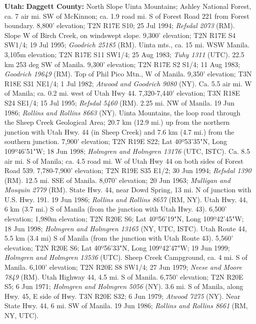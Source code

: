   \textbf{Utah:}
  \textbf{Daggett County:}
North Slope Uinta Mountains; Ashley National Forest, ca. 7 air mi. SW of
McKinnon; ca. 1.9 road mi. S of Forest Road 221 from Forest boundary.
8,800' elevation; T2N R17E S10; 25 Jul 1994; \textit{Refsdal 2073} (RM).
Slope W of Birch Creek, on windswept slope. 9,300' elevation; T2N R17E S4 SW1/4;
19 Jul 1995; \textit{Goodrich 25185} (RM).
Uinta mts., ca. 15 mi. WSW Manila. 3,105m elevation; T2N R17E S11 SW1/4;
25 Aug 1983; \textit{Tuhy 1311} (UTC).
22.5 km 253 deg SW of Manila. 9,300' elevation; T2N R17E S2 S1/4; 11 Aug 1983;
\textit{Goodrich 19649} (RM).
Top of Phil Pico Mtn., W of Manila. 9,350' elevation; T3N R18E S31 NE1/4;
1 Jul 1982; \textit{Atwood and Goodrich 9080} (NY).
Ca. 5.5 air mi. W of Manila; ca. 0.2 mi. west of Utah Hwy 44. 7,320-7,440'
elevation; T3N R18E S24 SE1/4; 15 Jul 1995; \textit{Refsdal 5460} (RM).
2.25 mi. NW of Manila. 19 Jun 1986; \textit{Rollins and Rollins 8663} (NY).
Uinta Mountains, the loop road through the Sheep Creek Geological Area; 20.7 km
(12.9 mi.) up from the northern junction with Utah Hwy. 44 (in Sheep Creek) and
7.6 km (4.7 mi.) from the southern junction. 7,900' elevation; T2N R19E S22;
Lat 40º53'35"N, Long 109º46'51"W; 18 Jun 1998;
\textit{Holmgren and Holmgren 13176} (UTC, ISTC).
Ca. 8.5 air mi. S of Manila; ca. 4.5 road mi. W of Utah Hwy 44 on both sides of
Forest Road 539. 7,780-7,900' elevation; T2N R19E S35 E1/2; 30 Jun 1994;
\textit{Refsdal 1390} (RM).
12.5 mi. SSE of Manila. 8,070' elevation; 20 Jun 1963;
\textit{Mulligan and Mosquin 2779} (RM).
State Hwy. 44, near Dowd Spring, 13 mi. N of junction with U.S. Hwy. 191.
19 Jun 1986; \textit{Rollins and Rollins 8657} (RM, NY).
Utah Hwy. 44, 6 km (3.7 mi.) S of Manila (from the junction with Utah Hwy. 43).
6,500' elevation; 1,980m elevation; T2N R20E S6;
Lat 40º56'19"N, Long 109º42'45"W; 18 Jun 1998;
\textit{Holmgren and Holmgren 13165} (NY, UTC, ISTC).
Utah Route 44, 5.5 km (3.4 mi) S of Manila (from the junction with Utah Route
43). 5,560' elevation; T2N R20E S6; Lat 40º56'33"N, Long 109º42'47"W;
19 Jun 1999; \textit{Holmgren and Holmgren 13536} (UTC).
Sheep Creek Campground, ca. 4 mi. S of Manila. 6,100' elevation;
T2N R20E S8 SW1/4; 27 Jun 1979; \textit{Neese and Moore 7849} (RM).
Utah Highway 44, 4.5 mi. S of Manila. 6,750' elevation; T2N R20E S5; 6 Jun 1971;
\textit{Holmgren and Holmgren 5056} (NY).
3.6 mi. S of Manila, along Hwy. 45, E side of Hwy. T3N R20E S32; 6 Jun 1979;
\textit{Atwood 7275} (NY).
Near State Hwy. 44, 6 mi. SW of Manila. 19 Jun 1986;
\textit{Rollins and Rollins 8661} (RM, NY, UTC).
